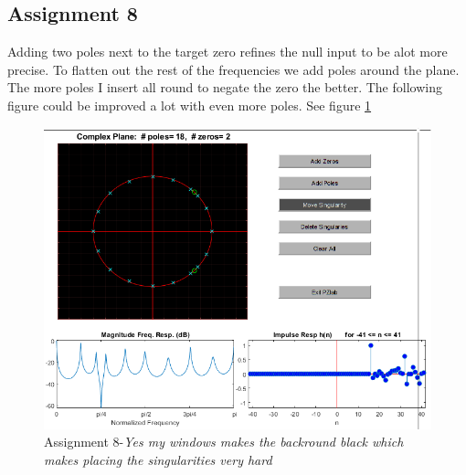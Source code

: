 \documentclass[a4paper]{article}
\begin{document}
\subsection{Assignment 8}
Adding two poles next to the target zero refines the null input to be alot more precise. To flatten out the rest of the frequencies we add poles around the plane. The more poles I insert all round to negate the zero the better. The following figure could be improved a lot with even more poles. See figure \ref{fig:8}\\
\begin{figure}
	\includegraphics{assignment8.png}
	\caption{Assignment 8-\textit{Yes my windows makes the backround black which makes placing the singularities very hard}}
	\label{fig:8}
\end{figure}
\end{document}
